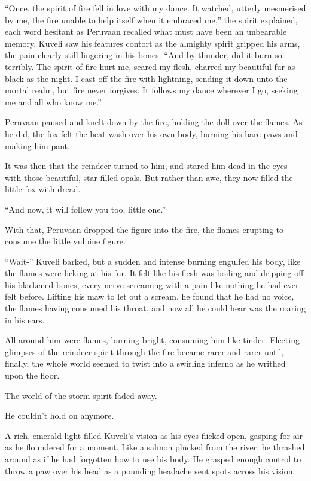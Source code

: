 ``Once, the spirit of fire fell in love with my dance. It watched, utterly mesmerised by me, the fire unable to help itself when it embraced me,'' the spirit explained, each word hesitant as Peruvaan recalled what must have been an unbearable memory. Kuveli saw his features contort as the almighty spirit gripped his arms, the pain clearly still lingering in his bones. ``And by thunder, did it burn so terribly. The spirit of fire hurt me, seared my flesh, charred my beautiful fur as black as the night. I cast off the fire with lightning, sending it down unto the mortal realm, but fire never forgives. It follows my dance wherever I go, seeking me and all who know me.''

Peruvaan paused and knelt down by the fire, holding the doll over the flames. As he did, the fox felt the heat wash over his own body, burning his bare paws and making him pant.

It was then that the reindeer turned to him, and stared him dead in the eyes with those beautiful, star-filled opals. But rather than awe, they now filled the little fox with dread.

``And now, it will follow you too, little one.''

With that, Peruvaan dropped the figure into the fire, the flames erupting to consume the little vulpine figure.

``Wait-'' Kuveli barked, but a sudden and intense burning engulfed his body, like the flames were licking at his fur. It felt like his flesh was boiling and dripping off his blackened bones, every nerve screaming with a pain like nothing he had ever felt before. Lifting his maw to let out a scream, he found that he had no voice, the flames having consumed his throat, and now all he could hear was the roaring in his ears.

All around him were flames, burning bright, consuming him like tinder. Fleeting glimpses of the reindeer spirit through the fire became rarer and rarer until, finally, the whole world seemed to twist into a swirling inferno as he writhed upon the floor.

The world of the storm spirit faded away.

He couldn't hold on anymore.

\secdiv

\noindent A rich, emerald light filled Kuveli's vision as his eyes flicked open, gasping for air as he floundered for a moment. Like a salmon plucked from the river, he thrashed around as if he had forgotten how to use his body. He grasped enough control to throw a paw over his head as a pounding headache sent spots across his vision.

